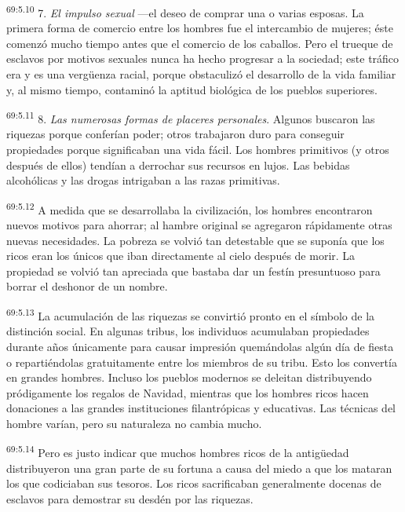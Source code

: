 \documentclass[twoside, 11pt]{book}
\begin{document}
\par
\textsuperscript{69:5.10} 7. \textit{El impulso sexual} ---el deseo de comprar una o varias esposas. La primera forma de comercio entre los hombres fue el intercambio de mujeres; éste comenzó mucho tiempo antes que el comercio de los caballos. Pero el trueque de esclavos por motivos sexuales nunca ha hecho progresar a la sociedad; este tráfico era y es una verg\"uenza racial, porque obstaculizó el desarrollo de la vida familiar y, al mismo tiempo, contaminó la aptitud biológica de los pueblos superiores.

\par
\textsuperscript{69:5.11} 8. \textit{Las numerosas formas de placeres personales}. Algunos buscaron las riquezas porque conferían poder; otros trabajaron duro para conseguir propiedades porque significaban una vida fácil. Los hombres primitivos (y otros después de ellos) tendían a derrochar sus recursos en lujos. Las bebidas alcohólicas y las drogas intrigaban a las razas primitivas.

\par
\textsuperscript{69:5.12} A medida que se desarrollaba la civilización, los hombres encontraron nuevos motivos para ahorrar; al hambre original se agregaron rápidamente otras nuevas necesidades. La pobreza se volvió tan detestable que se suponía que los ricos eran los únicos que iban directamente al cielo después de morir. La propiedad se volvió tan apreciada que bastaba dar un festín presuntuoso para borrar el deshonor de un nombre.

\par
\textsuperscript{69:5.13} La acumulación de las riquezas se convirtió pronto en el símbolo de la distinción social. En algunas tribus, los individuos acumulaban propiedades durante años únicamente para causar impresión quemándolas algún día de fiesta o repartiéndolas gratuitamente entre los miembros de su tribu. Esto los convertía en grandes hombres. Incluso los pueblos modernos se deleitan distribuyendo pródigamente los regalos de Navidad, mientras que los hombres ricos hacen donaciones a las grandes instituciones filantrópicas y educativas. Las técnicas del hombre varían, pero su naturaleza no cambia mucho.

\par
\textsuperscript{69:5.14} Pero es justo indicar que muchos hombres ricos de la antig\"uedad distribuyeron una gran parte de su fortuna a causa del miedo a que los mataran los que codiciaban sus tesoros. Los ricos sacrificaban generalmente docenas de esclavos para demostrar su desdén por las riquezas.
\end{document}
